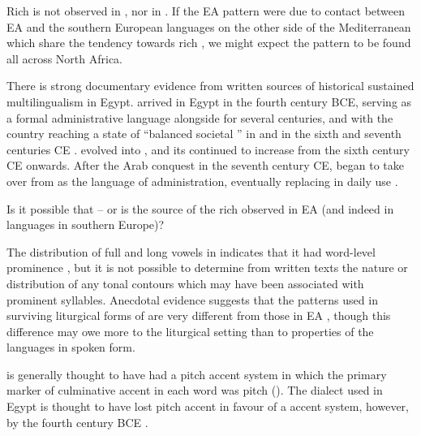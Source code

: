 \documentclass[output=paper]{langsci/langscibook}
\begin{document}
Rich  is not observed in   \citep{Benkirane1998}, nor in   \citep{Hellmuthtoappearbook}. If the EA  pattern were due to contact between EA and the southern European languages on the other side of the Mediterranean which share the tendency towards rich , we might expect the pattern to be found all across North Africa.

There is strong documentary evidence from written sources of historical sustained multilingualism in Egypt.  arrived in Egypt in the fourth century BCE, serving as a formal administrative language alongside  for several centuries, and with the country reaching a state of “balanced societal ” in  and  in the sixth and seventh centuries CE \citep[6]{Papaconstantinou2010}.  evolved into , and its  continued to increase from the sixth century CE onwards. After the Arab conquest in the seventh century CE,  began to take over from  as the language of administration, eventually replacing  in daily use \citep{Papaconstantinou2012}. 

Is it possible that -- or  is the source of the rich  observed in EA (and indeed in  languages in southern Europe)? 

The distribution of full and long vowels in  indicates that it had word-level prominence \citep[270]{Peust1999}, but it is not possible to determine from written texts the nature or distribution of any tonal contours which may have been associated with prominent syllables. Anecdotal evidence suggests that the  patterns used in surviving liturgical forms of  are very different from those in EA \citep[32]{Peust1999}, though this difference may owe more to the liturgical setting than to properties of the languages in spoken form.

  is generally thought to have had a pitch accent system in which the primary marker of culminative accent in each word was pitch (\citealt{DevineStephens1985}). The   dialect used in Egypt is thought to have lost pitch accent in favour of a  accent system, however, by the fourth century BCE \citep{Benaissa2012}. 
\end{document}
